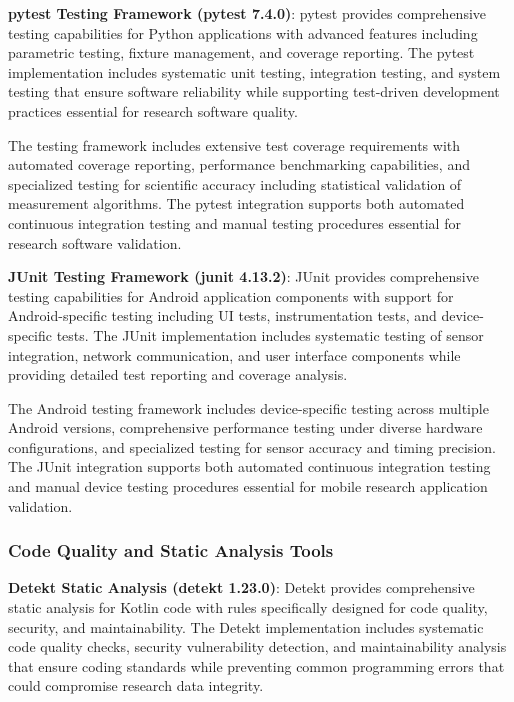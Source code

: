 \documentclass[11pt,a4paper]{report}
\begin{document}
\noindent \textbf{pytest Testing Framework (pytest 7.4.0)}: pytest provides comprehensive testing capabilities for Python applications with advanced features including parametric testing, fixture management, and coverage reporting. The pytest implementation includes systematic unit testing, integration testing, and system testing that ensure software reliability while supporting test-driven development practices essential for research software quality.

The testing framework includes extensive test coverage requirements with automated coverage reporting, performance benchmarking capabilities, and specialized testing for scientific accuracy including statistical validation of measurement algorithms. The pytest integration supports both automated continuous integration testing and manual testing procedures essential for research software validation.

\noindent \textbf{JUnit Testing Framework (junit 4.13.2)}: JUnit provides comprehensive testing capabilities for Android application components with support for Android-specific testing including UI tests, instrumentation tests, and device-specific tests. The JUnit implementation includes systematic testing of sensor integration, network communication, and user interface components while providing detailed test reporting and coverage analysis.

The Android testing framework includes device-specific testing across multiple Android versions, comprehensive performance testing under diverse hardware configurations, and specialized testing for sensor accuracy and timing precision. The JUnit integration supports both automated continuous integration testing and manual device testing procedures essential for mobile research application validation.

\subsubsection{Code Quality and Static Analysis Tools}

\noindent \textbf{Detekt Static Analysis (detekt 1.23.0)}: Detekt provides comprehensive static analysis for Kotlin code with rules specifically designed for code quality, security, and maintainability. The Detekt implementation includes systematic code quality checks, security vulnerability detection, and maintainability analysis that ensure coding standards while preventing common programming errors that could compromise research data integrity.
\end{document}
